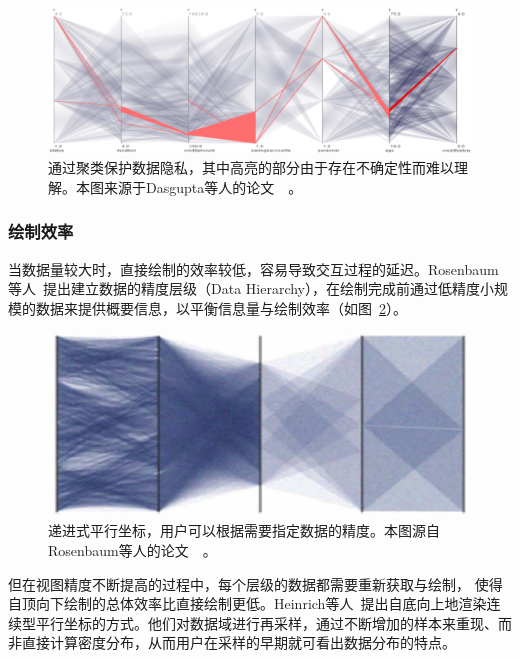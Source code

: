 \documentclass[12pt,twocolumn]{article}
\begin{document}
\begin{figure}[!htb]
\centering
\includegraphics[width=1.0\linewidth]{images/PC_Data_Privacy.eps}
\caption{\label{fig:PC_Data_Privacy}通过聚类保护数据隐私，其中高亮的部分由于存在不确定性而难以理解。本图来源于Dasgupta等人的论文~\citep{dasgupta2011adaptive}~。
}
\end{figure}

\subsubsection{绘制效率}

当数据量较大时，直接绘制的效率较低，容易导致交互过程的延迟。Rosenbaum等人~\citep{rosenbaum2012progressive}提出建立数据的精度层级（Data Hierarchy），在绘制完成前通过低精度小规模的数据来提供概要信息，以平衡信息量与绘制效率（如图~\ref{fig:PC_Data_Splatting}）。

\begin{figure}[!htb]
\centering
\includegraphics[width=0.8\linewidth]{images/PC_Data_Splatting.eps}
\caption{\label{fig:PC_Data_Splatting}递进式平行坐标，用户可以根据需要指定数据的精度。本图源自Rosenbaum等人的论文~\citep{rosenbaum2012progressive}~。
}
\end{figure}

但在视图精度不断提高的过程中，每个层级的数据都需要重新获取与绘制， 使得自顶向下绘制的总体效率比直接绘制更低。Heinrich等人~\citep{heinrich2011progressive}提出自底向上地渲染连续型平行坐标的方式。他们对数据域进行再采样，通过不断增加的样本来重现、而非直接计算密度分布，从而用户在采样的早期就可看出数据分布的特点。
\end{document}
